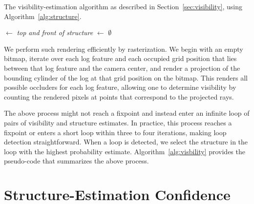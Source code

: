 \begin{algorithm}[t]
  \caption{The visibility-estimation algorithm as described in
    Section~\ref{sec:visibility}, using Algorithm~\ref{alg:structure}.}
  \Visible$\leftarrow$ \emph{top and front of structure}\;
  \CurrentStructure$\leftarrow$ $\emptyset$\;
  \label{alg:visbility}
\end{algorithm}

We perform such rendering efficiently by rasterization.
%
We begin with an empty bitmap, iterate over each log feature and each occupied
grid position that lies between that log feature and the camera center, and
render a projection of the bounding cylinder of the log at that grid position
on the bitmap.
%
This renders all possible occluders for each log feature, allowing one to
determine visibility by counting the rendered pixels at points that correspond
to the projected rays.

The above process might not reach a fixpoint and instead enter an infinite loop
of pairs of visibility and structure estimates.
%
In practice, this process reaches a fixpoint or enters a short loop within
three to four iterations, making loop detection straightforward.
%
When a loop is detected, we select the structure in the loop with the highest
probability estimate.
%
Algorithm~\ref{alg:visbility} provides the pseudo-code that summarizes the
above process.

\par\vspace{-1ex}
\section{Structure-Estimation Confidence}
\label{sec:confidence}

